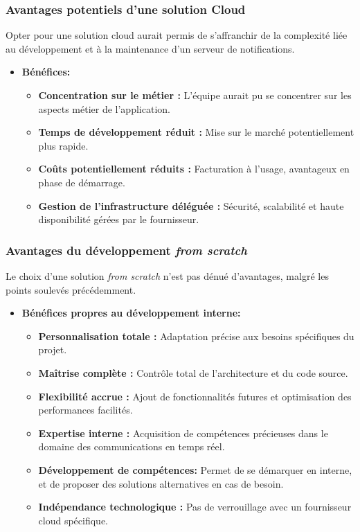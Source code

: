 \subsubsection{Avantages potentiels d'une solution Cloud}

Opter pour une solution cloud aurait permis de s'affranchir de la complexité liée au développement et à la maintenance d'un serveur de notifications.

\begin{itemize}
\item {\bf Bénéfices:}
	\begin{itemize}
    \item {\bf Concentration sur le métier :} L'équipe aurait pu se concentrer sur les aspects métier de l'application.
    \item {\bf Temps de développement réduit :} Mise sur le marché potentiellement plus rapide.
    \item {\bf Coûts potentiellement réduits :} Facturation à l'usage, avantageux en phase de démarrage.
    \item {\bf Gestion de l'infrastructure déléguée :} Sécurité, scalabilité et haute disponibilité gérées par le fournisseur.
	\end{itemize}
\end{itemize}

\subsubsection{Avantages du développement {\it from scratch}}

Le choix d'une solution {\it from scratch} n'est pas dénué d'avantages, malgré les points soulevés précédemment.

\begin{itemize}
\item {\bf Bénéfices propres au développement interne:}
	\begin{itemize}
    \item {\bf Personnalisation totale :} Adaptation précise aux besoins spécifiques du projet.
    \item {\bf Maîtrise complète :} Contrôle total de l'architecture et du code source.
    \item {\bf Flexibilité accrue :} Ajout de fonctionnalités futures et optimisation des performances facilités.
    \item {\bf Expertise interne :} Acquisition de compétences précieuses dans le domaine des communications en temps réel.
    \item {\bf Développement de compétences: } Permet de se démarquer en interne, et de proposer des solutions alternatives en cas de besoin.
    \item {\bf Indépendance technologique :} Pas de verrouillage avec un fournisseur cloud spécifique.
	\end{itemize}
\end{itemize}

